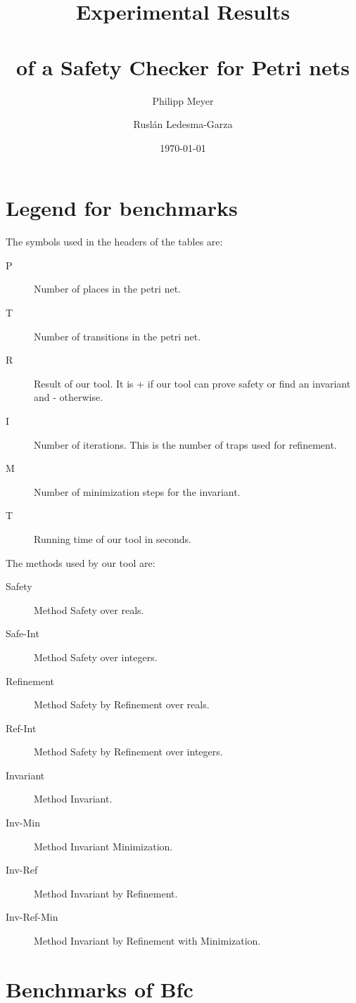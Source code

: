 \documentclass{article}
\newcommand{\bfc}{{\sc Bfc}}
\begin{document}
\title{Experimental Results \\ \mbox{ } \\ of a Safety Checker for Petri nets}
\author{Philipp Meyer \and Rusl\'{a}n Ledesma-Garza}
\date{\today}

\section{Legend for benchmarks}

The symbols used in the headers of the tables are:

\begin{description}
  \item[P] Number of places in the petri net.
  \item[T] Number of transitions in the petri net.
  \item[R] Result of our tool. It is + if our tool can prove safety or find an invariant and - otherwise.
  \item[I] Number of iterations. This is the number of traps used for refinement.
  \item[M] Number of minimization steps for the invariant.
  \item[T] Running time of our tool in seconds.
\end{description}

The methods used by our tool are:

\begin{description}
  \item[Safety] Method Safety over reals.
  \item[Safe-Int] Method Safety over integers.
  \item[Refinement] Method Safety by Refinement over reals.
  \item[Ref-Int] Method Safety by Refinement over integers.
  \item[Invariant] Method Invariant.
  \item[Inv-Min] Method Invariant Minimization.
  \item[Inv-Ref] Method Invariant by Refinement.
  \item[Inv-Ref-Min] Method Invariant by Refinement with Minimization.
\end{description}

\section{Benchmarks of \bfc}
\end{document}
